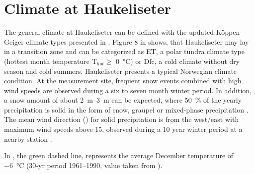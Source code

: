 %
%
%
\section{Climate at Haukeliseter}\label{sec:dim:dec_obs}
The general climate at Haukeliseter can be defined with the updated K\"oppen-Geiger climate types presented in \cite{peel_updated_2007}. Figure 8 in \cite{peel_updated_2007} shows, that Haukeliseter may lay in a transition zone and can be categorized as  ET, a polar tundra climate type (hottest month temperature T$_{hot}\ge$ \SI{0}{\celsius}) or Dfc, a cold climate without dry season and cold summers. 
% 
Haukeliseter presents a typical Norwegian climate condition. At the measurement site, frequent snow events combined with high wind speeds are observed during a six to seven month winter period. In addition, a snow amount of about \SIrange{2}{3}{\m} can be expected, where \SI{50}{\percent} of the yearly precipitation is solid in the form of snow, graupel or mixed-phase precipitation \citep{wolff_new_2010, wolff_measurements_2013, wolff_derivation_2015}. \\
The mean wind direction () for solid precipitation is from the west/east with maximum wind speeds above \SI{15}{\mPs}, observed during a 10 year winter period at a nearby station \citep{wolff_new_2010, wolff_derivation_2015}. 

In , the green dashed line, represents the average December temperature of \SI{-6}{\celsius} (30-yr period \numrange{1961}{1990}, value taken from \cite{eklima_norwegian_2016}).
